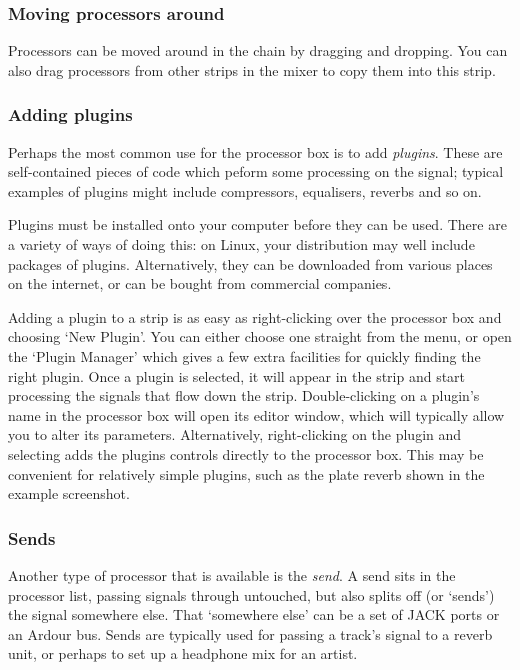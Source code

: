 \documentclass[10pt,a4paper]{book}
\newcommand{\menu}[1]{\emph{\StrSubstitute{#1}{,}{ $\rightarrow$ }}}
\begin{document}
{\subsubsection{Moving processors around}

Processors can be moved around in the chain by dragging and dropping.
You can also drag processors from other strips in the mixer to copy
them into this strip.  

\subsubsection{Adding plugins}

Perhaps the most common use for the processor box is to add
\emph{plugins}.  These are self-contained pieces of code which peform
some processing on the signal; typical examples of plugins might
include compressors, equalisers, reverbs and so on.

Plugins must be installed onto your computer before they can be used.
There are a variety of ways of doing this: on Linux, your distribution
may well include packages of plugins.  Alternatively, they can be
downloaded from various places on the internet, or can be bought from
commercial companies.


Adding a plugin to a strip is as easy as right-clicking over the
processor box and choosing `New Plugin'.  You can either choose one
straight from the menu, or open the `Plugin Manager' which gives a few
extra facilities for quickly finding the right plugin.  Once a plugin
is selected, it will appear in the strip and start processing the
signals that flow down the strip.  Double-clicking on a plugin's name
in the processor box will open its editor window, which will typically
allow you to alter its parameters.  Alternatively, right-clicking on
the plugin and selecting \menu{Controls,Show All Controls} adds the
plugins controls directly to the processor box.  This may be
convenient for relatively simple plugins, such as the plate reverb
shown in the example screenshot.

\subsubsection{Sends}

Another type of processor that is available is the \emph{send}.  A
send sits in the processor list, passing signals through untouched,
but also splits off (or `sends') the signal somewhere else.  That
`somewhere else' can be a set of JACK ports or an Ardour bus.  Sends
are typically used for passing a track's signal to a reverb unit, or
perhaps to set up a headphone mix for an artist.

}
\end{document}
